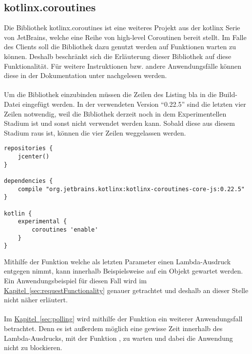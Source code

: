 \subsection{kotlinx.coroutines}\label{sec:kotlinxCoroutines}
Die Bibliothek kotlinx.coroutines \cite{kotlinxCoroutines} ist eine weiteres Projekt aus der kotlinx Serie von JetBrains, welche eine Reihe von high-level Coroutinen bereit stellt. Im Falle des Clients soll die Bibliothek dazu genutzt werden auf Funktionen warten zu können. Deshalb beschränkt sich die Erläuterung dieser Bibliothek auf diese Funktionalität. Für weitere Instruktionen bzw. andere Anwendungsfälle können diese in der Dokumentation unter \cite{kotlinxCoroutinesDocu} nachgelesen werden.\\
\\
Um die Bibliothek einzubinden müssen die Zeilen des Listing bla in die Build-Datei eingefügt werden. In der verwendeten Version \enquote{0.22.5} sind die letzten vier Zeilen notwendig, weil die Bibliothek derzeit noch in dem Experimentellen Stadium ist und sonst nicht verwendet werden kann. Sobald diese aus diesem Stadium raus ist, können die vier Zeilen weggelassen werden.
\begin{lstlisting}[style=lstStyleFramed, language=Gradle, caption={Einbindung der Bibliothek kotlinx.coroutines mithilfe von Gradle}, label=lst:includeKotlinxCoroutines, float]
repositories {
	jcenter()
}

dependencies {
	compile "org.jetbrains.kotlinx:kotlinx-coroutines-core-js:0.22.5"
}

kotlin {
	experimental {
		coroutines 'enable'
	}
}
\end{lstlisting}
Mithilfe der Funktion  welche als letzten Parameter einen Lambda-Ausdruck entgegen nimmt, kann innerhalb Beispielsweise auf ein  Objekt gewartet werden. Ein Anwendungsbeispiel für diesen Fall wird im \hyperref[sec:requestFunctionality]{Kapitel~\ref{sec:requestFunctionality}} genauer getrachtet und deshalb an dieser Stelle nicht näher erläutert.\\
\\
Im \hyperref[sec:polling]{Kapitel~\ref{sec:polling}} wird mithilfe der Funktion  ein weiterer Anwendungsfall betrachtet. Denn es ist außerdem möglich eine gewisse Zeit innerhalb des Lambda-Ausdrucks, mit der Funktion , zu warten und dabei die Anwendung nicht zu blockieren.

